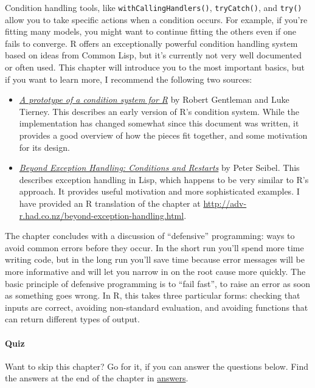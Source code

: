 Condition handling tools, like \texttt{withCallingHandlers()},
\texttt{tryCatch()}, and \texttt{try()} allow you to take specific
actions when a condition occurs. For example, if you're fitting many
models, you might want to continue fitting the others even if one fails
to converge. R offers an exceptionally powerful condition handling
system based on ideas from Common Lisp, but it's currently not very well
documented or often used. This chapter will introduce you to the most
important basics, but if you want to learn more, I recommend the
following two sources:

\begin{itemize}
\item
  \href{http://homepage.stat.uiowa.edu/~luke/R/exceptions/simpcond.html}{\emph{A
  prototype of a condition system for R}} by Robert Gentleman and Luke
  Tierney. This describes an early version of R's condition system.
  While the implementation has changed somewhat since this document was
  written, it provides a good overview of how the pieces fit together,
  and some motivation for its design.
\item
  \href{http://www.gigamonkeys.com/book/beyond-exception-handling-conditions-and-restarts.html}{\emph{Beyond
  Exception Handling: Conditions and Restarts}} by Peter Seibel. This
  describes exception handling in Lisp, which happens to be very similar
  to R's approach. It provides useful motivation and more sophisticated
  examples. I have provided an R translation of the chapter at
  \url{http://adv-r.had.co.nz/beyond-exception-handling.html}.
\end{itemize}

The chapter concludes with a discussion of ``defensive'' programming:
ways to avoid common errors before they occur. In the short run you'll
spend more time writing code, but in the long run you'll save time
because error messages will be more informative and will let you narrow
in on the root cause more quickly. The basic principle of defensive
programming is to ``fail fast'', to raise an error as soon as something
goes wrong. In R, this takes three particular forms: checking that
inputs are correct, avoiding non-standard evaluation, and avoiding
functions that can return different types of output.

\paragraph{Quiz}

Want to skip this chapter? Go for it, if you can answer the questions
below. Find the answers at the end of the chapter in
\hyperref[debugging-answers]{answers}.


